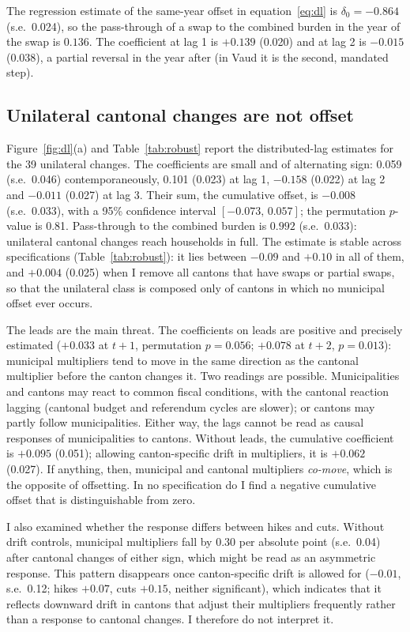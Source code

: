 \documentclass[11pt,a4paper]{article}
\begin{document}
The regression estimate of the same-year offset in equation~\eqref{eq:dl} is $\delta_0=-0.864$ (s.e.\ 0.024), so the pass-through of a swap to the combined burden in the year of the swap is $0.136$. The coefficient at lag 1 is $+0.139$ (0.020) and at lag 2 is $-0.015$ (0.038), a partial reversal in the year after (in Vaud it is the second, mandated step).

\subsection{Unilateral cantonal changes are not offset}

Figure~\ref{fig:dl}(a) and Table~\ref{tab:robust} report the distributed-lag estimates for the 39 unilateral changes. The coefficients are small and of alternating sign: 0.059 (s.e.\ 0.046) contemporaneously, 0.101 (0.023) at lag 1, $-0.158$ (0.022) at lag 2 and $-0.011$ (0.027) at lag 3. Their sum, the cumulative offset, is $-0.008$ (s.e.\ 0.033), with a 95\% confidence interval $[-0.073,\,0.057]$; the permutation $p$-value is 0.81. Pass-through to the combined burden is $0.992$ (s.e.\ 0.033): unilateral cantonal changes reach households in full. The estimate is stable across specifications (Table~\ref{tab:robust}): it lies between $-0.09$ and $+0.10$ in all of them, and $+0.004$ (0.025) when I remove all cantons that have swaps or partial swaps, so that the unilateral class is composed only of cantons in which no municipal offset ever occurs.

The leads are the main threat. The coefficients on leads are positive and precisely estimated ($+0.033$ at $t{+}1$, permutation $p=0.056$; $+0.078$ at $t{+}2$, $p=0.013$): municipal multipliers tend to move in the same direction as the cantonal multiplier before the canton changes it. Two readings are possible. Municipalities and cantons may react to common fiscal conditions, with the cantonal reaction lagging (cantonal budget and referendum cycles are slower); or cantons may partly follow municipalities. Either way, the lags cannot be read as causal responses of municipalities to cantons. Without leads, the cumulative coefficient is $+0.095$ (0.051); allowing canton-specific drift in multipliers, it is $+0.062$ (0.027). If anything, then, municipal and cantonal multipliers \emph{co-move}, which is the opposite of offsetting. In no specification do I find a negative cumulative offset that is distinguishable from zero.

I also examined whether the response differs between hikes and cuts. Without drift controls, municipal multipliers fall by $0.30$ per absolute point (s.e.\ 0.04) after cantonal changes of either sign, which might be read as an asymmetric response. This pattern disappears once canton-specific drift is allowed for ($-0.01$, s.e.\ 0.12; hikes $+0.07$, cuts $+0.15$, neither significant), which indicates that it reflects downward drift in cantons that adjust their multipliers frequently rather than a response to cantonal changes. I therefore do not interpret it.
\end{document}
